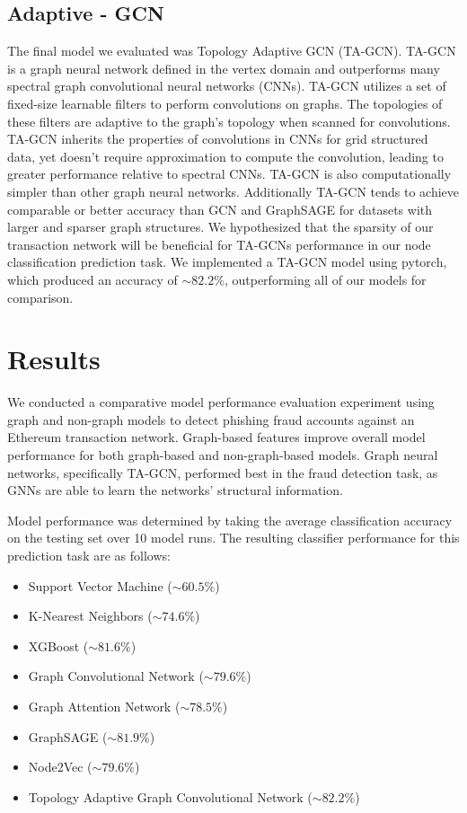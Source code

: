 \documentclass{article}
\begin{document}
\subsection{Adaptive - GCN}
	The final model we evaluated was Topology Adaptive GCN (TA-GCN). TA-GCN is a graph neural network defined in the vertex domain and outperforms many spectral graph convolutional neural networks (CNNs). TA-GCN utilizes a set of fixed-size learnable filters to perform convolutions on graphs. The topologies of these filters are adaptive to the graph’s topology when scanned for convolutions. TA-GCN inherits the properties of convolutions in CNNs for grid structured data, yet doesn’t require approximation to compute the convolution, leading to greater performance relative to spectral CNNs. TA-GCN is also computationally simpler than other graph neural networks. Additionally TA-GCN tends to achieve comparable or better accuracy than GCN and GraphSAGE for datasets with larger and sparser graph structures. We hypothesized that the sparsity of our transaction network will be beneficial for TA-GCNs performance in our node classification prediction task. We implemented a TA-GCN model using pytorch, which produced an accuracy of $\sim$$82.2\%$, outperforming all of our models for comparison.
 
\section{Results}
    We conducted a comparative model performance evaluation experiment using graph and non-graph models to detect phishing fraud accounts against an Ethereum transaction network. Graph-based features improve overall model performance for both graph-based and non-graph-based models. Graph neural networks, specifically TA-GCN, performed best in the fraud detection task, as GNNs are able to learn the networks’ structural information. 

    Model performance was determined by taking the average classification accuracy on the testing set over 10 model runs. The resulting classifier performance for this prediction task are as follows:
    
\begin{itemize}
  \item Support Vector Machine ($\sim$$60.5\%$)
  \item K-Nearest Neighbors ($\sim$$74.6\%$)
  \item XGBoost ($\sim$$81.6\%$)
  \item Graph Convolutional Network ($\sim$$79.6\%$)
  \item Graph Attention Network ($\sim$$78.5\%$)
  \item GraphSAGE ($\sim$$81.9\%$)
  \item Node2Vec ($\sim$$79.6\%$)
  \item Topology Adaptive Graph Convolutional Network ($\sim$$82.2\%$)
\end{itemize}
\end{document}
